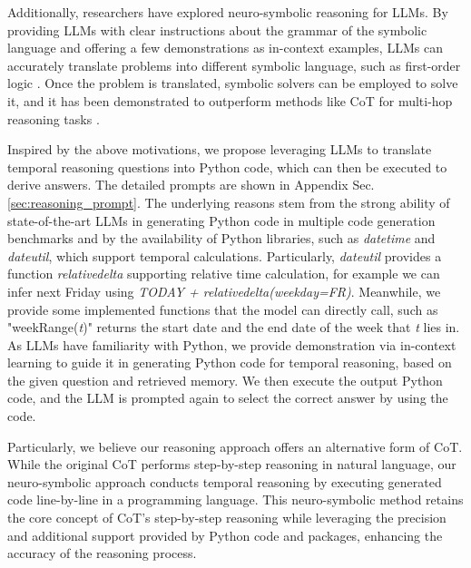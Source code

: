 Additionally, researchers have explored neuro-symbolic reasoning for LLMs. By providing LLMs with clear instructions about the grammar of the symbolic language and offering a few demonstrations as in-context examples, LLMs can accurately translate problems into different symbolic language, such as first-order logic \cite{han2022folio}. Once the problem is translated, symbolic solvers can be employed to solve it, and it has been demonstrated to outperform methods like CoT for multi-hop reasoning tasks \cite{pan2023logic}.

Inspired by the above motivations, we propose leveraging LLMs to translate temporal reasoning questions into Python code, which can then be executed to derive answers. The detailed prompts are shown in Appendix Sec.\ref{sec:reasoning_prompt}. The underlying reasons stem from the strong ability of state-of-the-art LLMs in generating Python code in multiple code generation benchmarks and by the availability of Python libraries, such as \textit{datetime} and \textit{dateutil}, which support temporal calculations. Particularly, \textit{dateutil} provides a function \textit{relativedelta} supporting relative time calculation, for example we can infer next Friday using \textit{TODAY + relativedelta(weekday=FR)}. Meanwhile, we provide some implemented functions that the model can directly call, such as "weekRange(\textit{t})" returns the start date and the end date of the week that \textit{t} lies in. As LLMs have familiarity with Python, we provide demonstration via in-context learning to guide it in generating Python code for temporal reasoning, based on the given question and retrieved memory. We then execute the output Python code, and the LLM is prompted again to select the correct answer by using the code.

Particularly, we believe our reasoning approach offers an alternative form of CoT. While the original CoT \cite{wei2022chain} performs step-by-step reasoning in natural language, our neuro-symbolic approach conducts temporal reasoning by executing generated code line-by-line in a programming language. This neuro-symbolic method retains the core concept of CoT’s step-by-step reasoning while leveraging the precision and additional support provided by Python code and packages, enhancing the accuracy of the reasoning process.